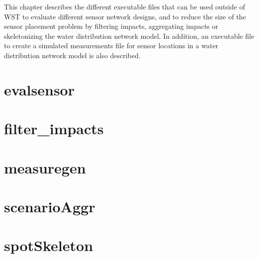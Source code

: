 This chapter describes the different executable files that can 
be used outside of WST to evaluate different sensor network 
designs, and to reduce the size of the sensor placement problem 
by filtering impacts, aggregating impacts or skeletonizing the 
water distribution network model. In addition, an executable file 
to create a simulated measurements file for sensor locations in a 
water distribution network model is also described.

\section{evalsensor}\label{evalsensorExecutable}

\newpage

\section{filter\_impacts}\label{filter_impactsExecutable}

\newpage

\section{measuregen}\label{measuregenExecutable}

\newpage

\section{scenarioAggr}\label{scenarioAggrExecutable}

\newpage

% 

\section{spotSkeleton}\label{skelExecutable}
 
\newpage

%

%

